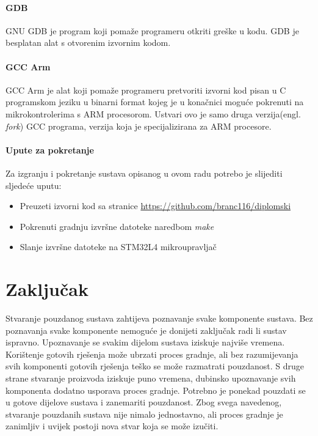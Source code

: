 \documentclass[times, utf8, diplomski]{diplomski}
\begin{document}
\subsubsection{GDB}
GNU GDB \cite{gdb} je program koji pomaže programeru otkriti greške u kodu. GDB je besplatan alat s otvorenim izvornim kodom.

\subsubsection{GCC Arm}
GCC Arm \cite{armgcc} je alat koji pomaže programeru pretvoriti izvorni kod pisan u C programskom jeziku u binarni format kojeg je u konačnici moguće pokrenuti na mikrokontrolerima s ARM procesorom. Ustvari ovo je samo druga verzija(engl. \textit{fork}) GCC \cite{gcc} programa, verzija koja je specijalizirana za ARM procesore.

\subsubsection{Upute za pokretanje}
Za izgranju i pokretanje sustava opisanog u ovom radu potrebo je slijediti sljedeće uputu:

\begin{itemize}
  \item Preuzeti izvorni kod sa stranice \url{https://github.com/branc116/diplomski}
  \item Pokrenuti gradnju izvršne datoteke naredbom \textit{make}
  \item Slanje izvršne datoteke na STM32L4 mikroupravljač
\end{itemize}

\chapter{Zaključak}
Stvaranje pouzdanog sustava zahtijeva poznavanje svake komponente sustava.
Bez poznavanja svake komponente nemoguće je donijeti zaključak radi li sustav ispravno.
Upoznavanje se svakim dijelom sustava iziskuje najviše vremena.
Korištenje gotovih rješenja može ubrzati proces gradnje, ali bez razumijevanja svih komponenti gotovih rješenja teško se može razmatrati pouzdanost.
S druge strane stvaranje proizvoda iziskuje puno vremena, dubinsko upoznavanje svih komponenta dodatno usporava proces gradnje.
Potrebno je ponekad pouzdati se u gotove dijelove sustava i zanemariti pouzdanost.
Zbog svega navedenog, stvaranje pouzdanih sustava nije nimalo jednostavno, ali proces gradnje je zanimljiv i uvijek postoji nova stvar koja se može izučiti.
\end{document}
